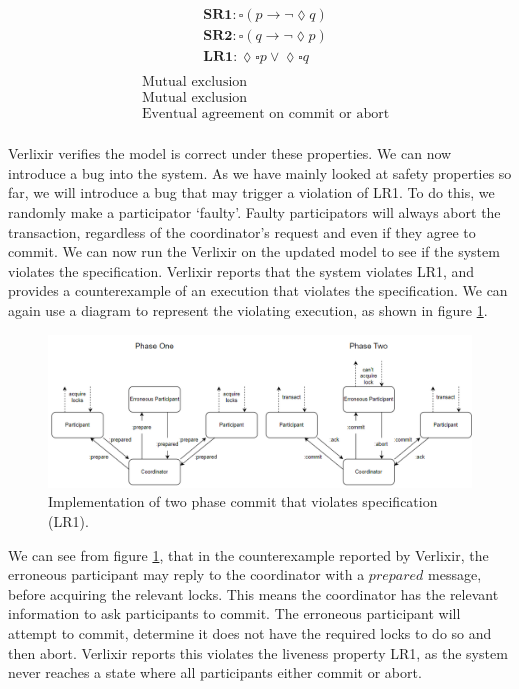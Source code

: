 \begin{multicols}{2}
    \[
    \begin{aligned}
    &\textbf{SR1}: \square \left( p \rightarrow \neg \lozenge q \right) \\
    &\textbf{SR2}: \square \left( q \rightarrow \neg \lozenge p \right) \\
    &\textbf{LR1}: \lozenge \square p \lor \lozenge \square q \\
    \end{aligned}
    \]
    \vline
    \[
    \begin{aligned}
    &\text{Mutual exclusion} \\
    &\text{Mutual exclusion} \\
    &\text{Eventual agreement on commit or abort} \\
    \end{aligned}
    \]
\end{multicols}
Verlixir verifies the model is correct under these properties. We can now introduce a bug into the system. As we have mainly looked at safety properties so far, we will introduce a bug that may trigger a violation of LR1. To do this, we randomly make a participator `faulty'. Faulty participators will always abort the transaction, regardless of the coordinator's request and even if they agree to commit. We can now run the Verlixir on the updated model to see if the system violates the specification. Verlixir reports that the system violates LR1, and provides a counterexample of an execution that violates the specification. We can again use a diagram to represent the violating execution, as shown in figure \ref{fig:2pc}.
\par
\begin{figure}[h]
    \centering
    \includegraphics[width=1\textwidth]{images/2pc.png}
    \caption{Implementation of two phase commit that violates specification (LR1).}
    \label{fig:2pc}
\end{figure}
\par
We can see from figure \ref{fig:2pc}, that in the counterexample reported by Verlixir, the erroneous participant may reply to the coordinator with a $prepared$ message, before acquiring the relevant locks. This means the coordinator has the relevant information to ask participants to commit. The erroneous participant will attempt to commit, determine it does not have the required locks to do so and then abort. Verlixir reports this violates the liveness property LR1, as the system never reaches a state where all participants either commit or abort.
